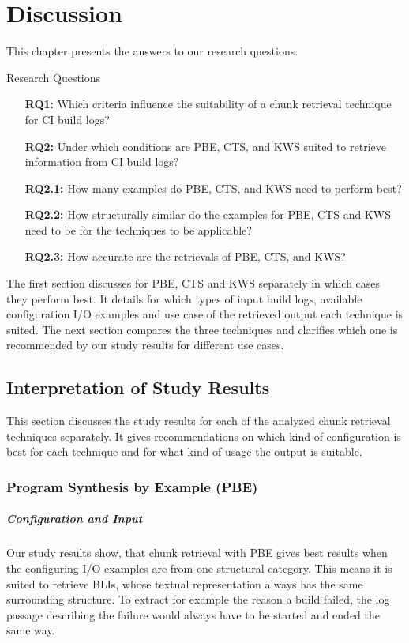 \documentclass[\myrootdir/main.tex]{subfiles}
\begin{document}
\chapter{Discussion}
\label{sec:discussion}

This chapter presents the answers to our research questions:
\begin{simplebox}{Research Questions}
\begin{itemize}
  \item[\textbf{RQ1:}] Which criteria influence the suitability of a chunk retrieval technique for CI build logs?
  \item[\textbf{RQ2:}] Under which conditions are PBE, CTS, and KWS suited to retrieve information from CI build logs?
  \item[\textbf{RQ2.1:}] How many examples do PBE, CTS, and KWS need to perform best?
  \item[\textbf{RQ2.2:}] How structurally similar do the examples for PBE, CTS and KWS need to be for the techniques to be applicable?
  \item[\textbf{RQ2.3:}] How accurate are the retrievals of PBE, CTS, and KWS?
\end{itemize}
\end{simplebox}

The first section discusses for PBE, CTS and KWS separately in which cases they perform best.
It details for which types of input build logs, available configuration I/O examples and use case of the retrieved output each technique is suited.
The next section compares the three techniques and clarifies which one is recommended by our study results for different use cases.

\section{Interpretation of Study Results}
This section discusses the study results for each of the analyzed chunk retrieval techniques separately.
It gives recommendations on which kind of configuration is best for each technique and for what kind of usage the output is suitable.

\subsection{Program Synthesis by Example (PBE)}
\paragraph{Configuration and Input}
Our study results show, that chunk retrieval with PBE gives best results when the configuring I/O examples are from one structural category.
This means it is suited to retrieve BLIs, whose textual representation always has the same surrounding structure.
To extract for example the reason a build failed, the log passage describing the failure would always have to be started and ended the same way.
\end{document}
